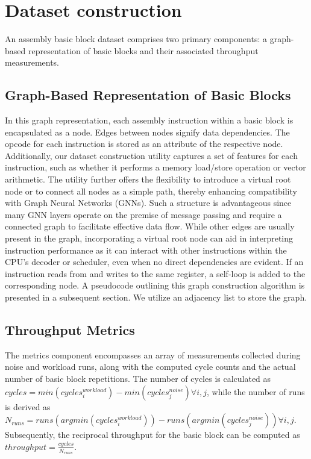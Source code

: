 \section{Dataset construction}

An assembly basic block dataset comprises two primary components: a graph-based representation of 
basic blocks and their associated throughput measurements.

\subsection{Graph-Based Representation of Basic Blocks}

In this graph representation, each assembly instruction within a basic block is encapsulated as a 
node. Edges between nodes signify data dependencies. The opcode for each instruction is stored as 
an attribute of the respective node. Additionally, our dataset construction utility captures a set 
of features for each instruction, such as whether it performs a memory load/store operation or vector 
arithmetic. The utility further offers the flexibility to introduce a virtual root node or to connect 
all nodes as a simple path, thereby enhancing compatibility with Graph Neural Networks (GNNs). Such 
a structure is advantageous since many GNN layers operate on the premise of message passing and require 
a connected graph to facilitate effective data flow. While other edges are usually present in the graph, 
incorporating a virtual root node can aid in interpreting instruction performance as it can interact with 
other instructions within the CPU's decoder or scheduler, even when no direct dependencies are evident. 
If an instruction reads from and writes to the same register, a self-loop is added to the corresponding 
node. A pseudocode outlining this graph construction algorithm is presented in a subsequent section. 
We utilize an adjacency list to store the graph.

\subsection{Throughput Metrics}

The metrics component encompasses an array of measurements collected during noise and workload runs, 
along with the computed cycle counts and the actual number of basic block repetitions. The number of 
cycles is calculated as
$cycles = min(cycles^{workload}_i) - min(cycles^{noise}_j) \forall i, j$, while the number of runs 
is derived as $N_{runs} = runs(argmin(cycles^{workload}_i)) - runs(argmin(cycles^{noise}_j)) \forall i, j$. 
Subsequently, the reciprocal throughput for the basic block can be computed as 
$throughput = \frac{cycles}{N_{runs}}$.

